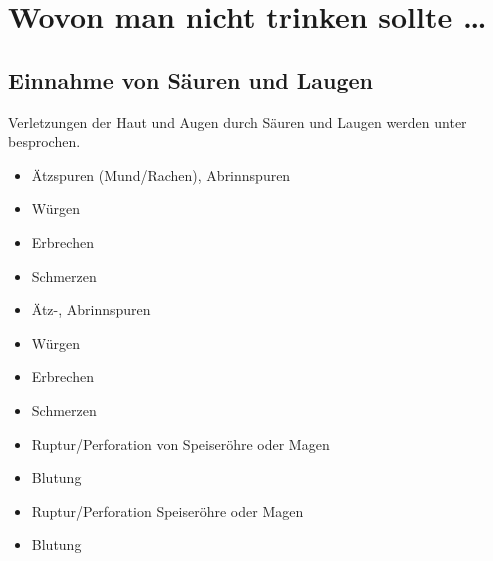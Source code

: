 \clearpage
\section{Wovon man nicht trinken sollte \ldots}

\subsection{Einnahme von Säuren und Laugen}
\label{topic:veraetzung-intoxikation}

Verletzungen der Haut und Augen durch Säuren und
Laugen werden unter 
besprochen.

{\TxBeschreibung}
{%
}
{}
{}
{}
{}
% 
% 

{
\begin{itemize}
    \item Ätzspuren (Mund/Rachen), Abrinnspuren
    \item Würgen
    \item Erbrechen
    \item Schmerzen
\end{itemize}
}{%
\begin{itemize}
  \item Ätz-, Abrinnspuren
  \item Würgen
  \item Erbrechen
  \item Schmerzen
\end{itemize}
}{}{}{}

{%
\begin{itemize}
  \item Ruptur/Perforation von Speiseröhre oder Magen
  \item Blutung
\end{itemize}
}{
\begin{itemize}
  \item Ruptur/Perforation Speiseröhre oder Magen
  \item Blutung
\end{itemize}
}{}{}{}



